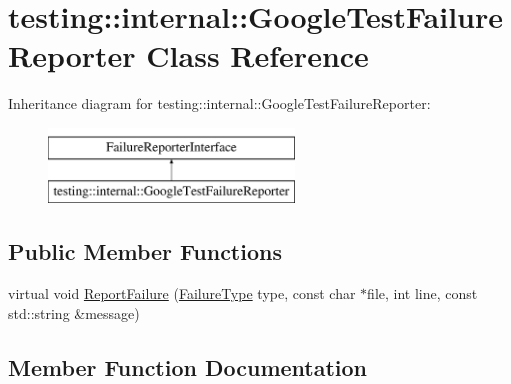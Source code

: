 \hypertarget{classtesting_1_1internal_1_1GoogleTestFailureReporter}{}\section{testing\+::internal\+::Google\+Test\+Failure\+Reporter Class Reference}
\label{classtesting_1_1internal_1_1GoogleTestFailureReporter}
Inheritance diagram for testing\+::internal\+::Google\+Test\+Failure\+Reporter\+:\begin{figure}[H]
\begin{center}
\leavevmode
\includegraphics[height=2.000000cm]{classtesting_1_1internal_1_1GoogleTestFailureReporter}
\end{center}
\end{figure}
\subsection*{Public Member Functions}
\begin{DoxyCompactItemize}
\item 
virtual void \mbox{\hyperlink{classtesting_1_1internal_1_1GoogleTestFailureReporter_a096dae47177340acac5f3d6528b852ca}{Report\+Failure}} (\mbox{\hyperlink{gtest__environment__test_8cc_aa43ad7e2c1c5c5150ba8d95607a96263}{Failure\+Type}} type, const char $\ast$file, int line, const std\+::string \&message)
\end{DoxyCompactItemize}


\subsection{Member Function Documentation}
\mbox{\label{classtesting_1_1internal_1_1GoogleTestFailureReporter_a096dae47177340acac5f3d6528b852ca}} 
